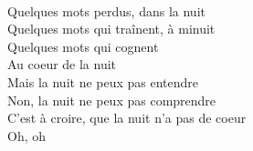 \\
Quelques mots perdus, dans la nuit \\
Quelques mots qui traînent, à minuit \\
Quelques mots qui cognent \\
Au coeur de la nuit \\
Mais la nuit ne peux pas entendre \\
Non, la nuit ne peux pas comprendre \\
C'est à croire, que la nuit n'a pas de coeur \\
Oh, oh \\
